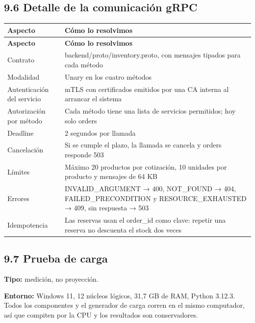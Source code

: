 \documentclass[10pt,letterpaper]{article}
\begin{document}
\subsection*{9.6 Detalle de la comunicación gRPC}
{\footnotesize
\begin{longtable}{|P{\tabcolsep\relax}|P{\tabcolsep\relax}|}
\hline
\textbf{Aspecto} & \textbf{Cómo lo resolvimos} \\ \hline
\endfirsthead
\hline
\textbf{Aspecto} & \textbf{Cómo lo resolvimos} \\ \hline
\endhead
Contrato & backend/\allowbreak{}proto/\allowbreak{}inventory.\allowbreak{}proto, con mensajes tipados para cada método \\ \hline
Modalidad & Unary en los cuatro métodos \\ \hline
Autenticación del servicio & mTLS con certificados emitidos por una CA interna al arrancar el sistema \\ \hline
Autorización por método & Cada método tiene una lista de servicios permitidos; hoy solo orders \\ \hline
Deadline & 2 segundos por llamada \\ \hline
Cancelación & Si se cumple el plazo, la llamada se cancela y orders responde 503 \\ \hline
Límites & Máximo 20 productos por cotización, 10 unidades por producto y mensajes de 64 KB \\ \hline
Errores & INVALID\_\allowbreak{}ARGUMENT → 400, NOT\_\allowbreak{}FOUND → 404, FAILED\_\allowbreak{}PRECONDITION y RESOURCE\_\allowbreak{}EXHAUSTED → 409, sin respuesta → 503 \\ \hline
Idempotencia & Las reservas usan el order\_\allowbreak{}id como clave: repetir una reserva no descuenta el stock dos veces \\ \hline
\end{longtable}}

\subsection*{9.7 Prueba de carga}
\textbf{Tipo:} medición, no proyección.

\textbf{Entorno:} Windows 11, 12 núcleos lógicos, 31,\allowbreak{}7 GB de RAM, Python 3.12.3. Todos los componentes y el generador de carga corren en el mismo computador, así que compiten por la CPU y los resultados son conservadores.
\end{document}
